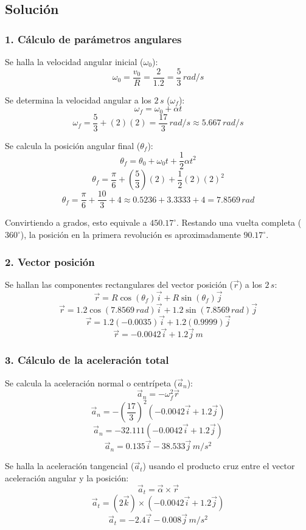\documentclass[12pt, a4paper]{article}
\begin{document}
\subsection*{Solución}

\subsubsection*{1. Cálculo de parámetros angulares}
Se halla la velocidad angular inicial ($\omega_0$):
$$ \omega_0 = \frac{v_0}{R} = \frac{2}{1.2} = \frac{5}{3} \, \si{rad/s} $$

Se determina la velocidad angular a los $2 \, \si{s}$ ($\omega_f$):
$$ \omega_f = \omega_0 + \alpha t $$
$$ \omega_f = \frac{5}{3} + (2)(2) = \frac{17}{3} \, \si{rad/s} \approx 5.667 \, \si{rad/s} $$

Se calcula la posición angular final ($\theta_f$):
$$ \theta_f = \theta_0 + \omega_0 t + \frac{1}{2}\alpha t^2 $$
$$ \theta_f = \frac{\pi}{6} + \left(\frac{5}{3}\right)(2) + \frac{1}{2}(2)(2)^2 $$
$$ \theta_f = \frac{\pi}{6} + \frac{10}{3} + 4 \approx 0.5236 + 3.3333 + 4 = 7.8569 \, \si{rad} $$

Convirtiendo a grados, esto equivale a $450.17^\circ$. Restando una vuelta completa ($360^\circ$), la posición en la primera revolución es aproximadamente $90.17^\circ$.

\subsubsection*{2. Vector posición}
Se hallan las componentes rectangulares del vector posición ($\vec{r}$) a los $2 \, \si{s}$:
$$ \vec{r} = R\cos(\theta_f)\vec{i} + R\sin(\theta_f)\vec{j} $$
$$ \vec{r} = 1.2\cos(7.8569 \, \si{rad})\vec{i} + 1.2\sin(7.8569 \, \si{rad})\vec{j} $$
$$ \vec{r} = 1.2(-0.0035)\vec{i} + 1.2(0.9999)\vec{j} $$
$$ \vec{r} = -0.0042\vec{i} + 1.2\vec{j} \, \si{m} $$

\subsubsection*{3. Cálculo de la aceleración total}
Se calcula la aceleración normal o centrípeta ($\vec{a}_n$):
$$ \vec{a}_n = -\omega_f^2 \vec{r} $$
$$ \vec{a}_n = -\left(\frac{17}{3}\right)^2 (-0.0042\vec{i} + 1.2\vec{j}) $$
$$ \vec{a}_n = -32.111 (-0.0042\vec{i} + 1.2\vec{j}) $$
$$ \vec{a}_n = 0.135\vec{i} - 38.533\vec{j} \, \si{m/s^2} $$

Se halla la aceleración tangencial ($\vec{a}_t$) usando el producto cruz entre el vector aceleración angular y la posición:
$$ \vec{a}_t = \vec{\alpha} \times \vec{r} $$
$$ \vec{a}_t = (2\vec{k}) \times (-0.0042\vec{i} + 1.2\vec{j}) $$
$$ \vec{a}_t = -2.4\vec{i} - 0.008\vec{j} \, \si{m/s^2} $$
\end{document}
